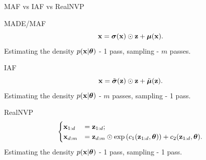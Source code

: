 \begin{frame}{MAF vs IAF vs RealNVP}
	\begin{block}{MADE/MAF}
		\vspace{-0.5cm}
		\[
		\mathbf{x} = \boldsymbol{\sigma} (\mathbf{x}) \odot \mathbf{z} + \boldsymbol{\mu}(\mathbf{x}).
		\]
		Estimating the density $p(\mathbf{x} | \boldsymbol{\theta})$ - 1 pass, sampling - $m$ passes.
	\end{block}
	\begin{block}{IAF}
		\vspace{-0.5cm}
		\[
		\mathbf{x} = \tilde{\boldsymbol{\sigma}} (\mathbf{z}) \odot \mathbf{z} + \tilde{\boldsymbol{\mu}}(\mathbf{z}).
		\]
		Estimating the density $p(\mathbf{x} | \boldsymbol{\theta})$ - $m$ passes, sampling - 1 pass.
	\end{block}
	\begin{block}{RealNVP}
		\vspace{-0.2cm}
		\[
			\begin{cases}
				\mathbf{x}_{1:d} &= \mathbf{z}_{1:d}; \\ 
				\mathbf{x}_{d:m} &= \mathbf{z}_{d:m} \odot \exp \left(c_1(\mathbf{z}_{1:d}, \boldsymbol{\theta})\right) + c_2(\mathbf{z}_{1:d}, \boldsymbol{\theta}).
			\end{cases}
		\]
		\vspace{-0.5cm}
		Estimating the density $p(\mathbf{x} | \boldsymbol{\theta})$ - 1 pass, sampling - 1 pass.
	\end{block}
\end{frame}
